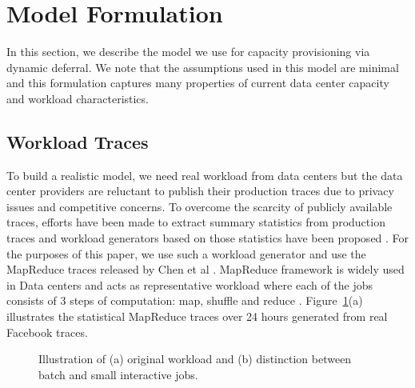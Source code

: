 \documentclass[10pt,conference,compsocconf,letterpaper]{IEEEtran}
\begin{document}
\section{Model Formulation}
In this section, we describe the model we use for capacity provisioning via dynamic deferral. We note that the assumptions used in this model are minimal and this formulation captures many properties of current data center capacity and workload characteristics.

\subsection{Workload Traces}
To build a realistic model, we need real workload from data centers but the data center providers are reluctant to publish their production traces due to privacy issues and competitive concerns. To overcome the scarcity of publicly available traces, efforts have been made to extract summary statistics from production traces and workload generators based on those statistics have been proposed \cite{n4,n5}. For the purposes of this paper, we use such a workload generator and use the MapReduce traces released by Chen et al \cite{n4}. MapReduce framework is widely used in Data centers and acts as representative workload where each of the jobs consists of 3 steps of computation: map, shuffle and reduce \cite{n3}. Figure~\ref{fig:original_workload}(a) illustrates the statistical  MapReduce traces over 24 hours generated from real Facebook traces.



\begin{figure}[!t]
\centerline{
\hfil
{}}
\caption{Illustration of (a) original workload and (b) distinction between batch and small interactive jobs.
}
\label{fig:original_workload}
\end{figure}
\end{document}
